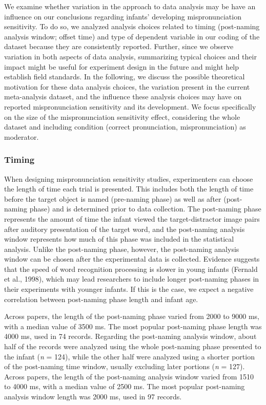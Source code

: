 \documentclass[man]{apa6}
\begin{document}
We examine whether variation in the approach to data analysis may be have an influence on our conclusions regarding infants' developing mispronunciation sensitivity. To do so, we analyzed analysis choices related to timing (post-naming analysis window; offset time) and type of dependent variable in our coding of the dataset because they are consistently reported. Further, since we observe variation in both aspects of data analysis, summarizing typical choices and their impact might be useful for experiment design in the future and might help establish field standards. In the following, we discuss the possible theoretical motivation for these data analysis choices, the variation present in the current meta-analysis dataset, and the influence these analysis choices may have on reported mispronunciation sensitivity and its development. We focus specifically on the size of the mispronunciation sensitivity effect, considering the whole dataset and including condition (correct pronunciation, mispronunciation) as moderator.

\hypertarget{timing}{%
\subsubsection{Timing}\label{timing}}

When designing mispronunciation sensitivity studies, experimenters can choose the length of time each trial is presented. This includes both the length of time before the target object is named (pre-naming phase) as well as after (post-naming phase) and is determined prior to data collection. The post-naming phase represents the amount of time the infant viewed the target-distractor image pairs after auditory presentation of the target word, and the post-naming analysis window represents how much of this phase was included in the statistical analysis. Unlike the post-naming phase, however, the post-naming analysis window can be chosen after the experimental data is collected. Evidence suggests that the speed of word recognition processing is slower in young infants (Fernald et al., 1998), which may lead researchers to include longer post-naming phases in their experiments with younger infants. If this is the case, we expect a negative correlation between post-naming phase length and infant age.

Across papers, the length of the post-naming phase varied from 2000 to 9000 ms, with a median value of 3500 ms. The most popular post-naming phase length was 4000 ms, used in 74 records. Regarding the post-naming analysis window, about half of the records were analyzed using the whole post-naming phase presented to the infant (\emph{n} = 124), while the other half were analyzed using a shorter portion of the post-naming time window, usually excluding later portions (\emph{n} = 127). Across papers, the length of the post-naming analysis window varied from 1510 to 4000 ms, with a median value of 2500 ms.
The most popular post-naming analysis window length was 2000 ms, used in 97 records.
\end{document}
